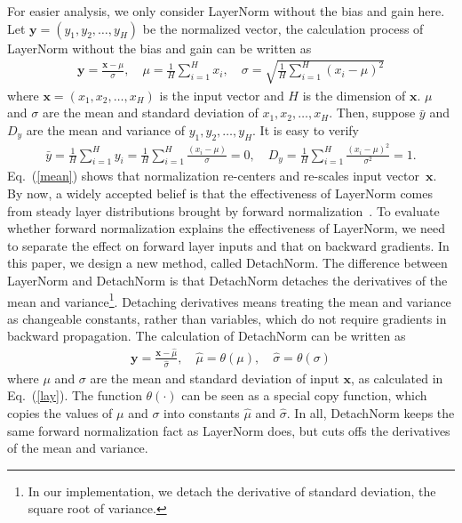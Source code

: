\documentclass{article}
\newcommand*{\vect}[1]{\textbf{#1}}
\begin{document}
 
For easier analysis, we only consider LayerNorm without the bias and gain here. Let $\vect{y}= (y_1, y_2, \ldots, y_H)$ be the normalized vector, the calculation process of LayerNorm without the bias and gain can be written as
\begin{equation}\begin{aligned}
\vect{y}= \frac{\vect{x}-\mu}{\sigma}, \quad \mu=\frac{1}{H}\sum\limits_{i=1}^Hx_i,\quad
\sigma=\sqrt{\frac{1}{H}\sum\limits_{i=1}^H(x_i-\mu)^2}
\label{lay}
\end{aligned}\end{equation}
where $\vect{x} = (x_1, x_2, \ldots, x_H) $ is the input vector and $H$ is the dimension of $\vect{x}$. $\mu$ and $\sigma$ are the mean and standard deviation of $x_1, x_2, \ldots, x_H$. Then, suppose $\bar y$ and $D_y$ are the mean and variance of $y_1, y_2, \ldots, y_H$. It is easy to verify 
\begin{equation}\begin{aligned}
\bar y=\frac{1}{H}\sum\limits_{i=1}^{H}y_i=\frac{1}{H}\sum\limits_{i=1}^{H}\frac{(x_i-\mu)}{\sigma}=0, \quad D_y=\frac{1}{H}\sum\limits_{i=1}^{H}\frac{(x_i-\mu)^2}{\sigma^2}=1.
\label{mean}
\end{aligned}\end{equation}
Eq.~(\ref{mean}) shows that normalization re-centers and re-scales input vector~$\vect{x}$. By now,  a widely accepted belief is that the effectiveness of LayerNorm comes from steady layer distributions brought by forward normalization~\citep{lei2016layer}.
To evaluate whether forward normalization explains the effectiveness of LayerNorm, we need to separate the effect on forward layer inputs and that on backward gradients. In this paper, we design a new method, called DetachNorm. The difference between LayerNorm and DetachNorm is that DetachNorm detaches the derivatives of the mean and variance\footnote{In our implementation, we detach the derivative of standard deviation, the square root of variance. }. Detaching  derivatives means treating the mean and variance as changeable constants, rather than variables, which do not require gradients in backward propagation.   The calculation of DetachNorm can be written as 
\begin{equation}\begin{aligned}
\vect{y}= \frac{\vect{x}-\hat{\mu}}{\hat{\sigma}}, \quad \hat{\mu} = \theta(\mu), \quad \hat{\sigma} = \theta(\sigma)
\end{aligned}\end{equation}
where $\mu$ and $\sigma$ are the mean and standard deviation of input $\vect{x}$, as calculated in Eq.~(\ref{lay}). The function $\theta(\cdot)$ can be seen as a special copy function, which copies the values of $\mu$ and $\sigma$ into constants  $\hat{\mu}$ and $\hat{\sigma}$. In all, DetachNorm keeps the same forward normalization fact as LayerNorm does, but cuts offs the derivatives of the mean and variance. 
\end{document}
